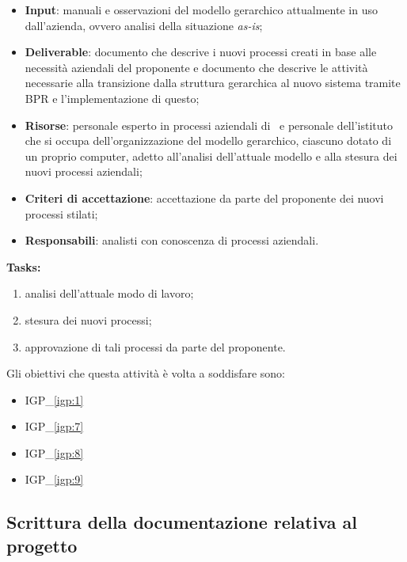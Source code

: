 		\begin{itemize}[noitemsep]
			\renewcommand\labelitemi{--}
			\item \textbf{Input}: manuali e osservazioni del modello gerarchico attualmente in uso dall'azienda, ovvero analisi della situazione \textit{as-is};
			\item \textbf{Deliverable}: documento che descrive i nuovi processi creati in base alle necessità aziendali del proponente e documento che descrive le attività necessarie alla transizione dalla struttura gerarchica al nuovo sistema tramite BPR e l'implementazione di questo;
			\item \textbf{Risorse}: personale esperto in processi aziendali di \azienda~e personale dell'istituto che si occupa dell'organizzazione del modello gerarchico, ciascuno dotato di un proprio computer, adetto all'analisi dell'attuale modello e alla stesura dei nuovi processi aziendali;
			\item \textbf{Criteri di accettazione}: accettazione da parte del proponente dei nuovi processi stilati;
			\item \textbf{Responsabili}: analisti con conoscenza di processi aziendali.
		\end{itemize}
	
		\textbf{Tasks:}
		\begin{enumerate}[noitemsep]
			\item analisi dell'attuale modo di lavoro;
			\item stesura dei nuovi processi;
			\item approvazione di tali processi da parte del proponente.
		\end{enumerate}
	
		Gli obiettivi che questa attività è volta a soddisfare sono:
		\begin{itemize}[noitemsep]
			\renewcommand\labelitemi{--}
			\item {\color{pantone}IGP\_\ref{igp:1}}
			\item {\color{pantone}IGP\_\ref{igp:7}}
			\item {\color{pantone}IGP\_\ref{igp:8}}
			\item {\color{pantone}IGP\_\ref{igp:9}}
		\end{itemize}

	\subsection{Scrittura della documentazione relativa al progetto}
	
